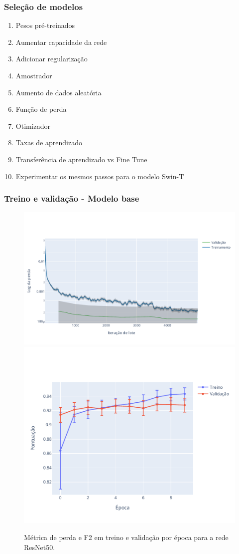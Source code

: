 \documentclass{beamer}
\begin{document}
\begin{frame}
\frametitle{Seleção de modelos}
\begin{enumerate}
    \item Pesos pré-treinados
    \item Aumentar capacidade da rede
    \item Adicionar regularização 
    \item Amostrador
    \item Aumento de dados aleatória
    \item Função de perda
    \item Otimizador
    \item Taxas de aprendizado
    \item Transferência de aprendizado vs Fine Tune
    \item Experimentar os mesmos passos para o modelo Swin-T
\end{enumerate}
\end{frame}



\begin{frame}
\frametitle{Treino e validação - Modelo base}


\begin{figure}[!ht]
    \centering
    \includegraphics[width=0.55\columnwidth]{Imagens/results/rsp-resnet-50_planet_pt/Training Loss Per Minibatch.pdf}
    \label{fig:TreinoResnetPerda}
    \centering
    \includegraphics[width=0.40\columnwidth]{Imagens/results/rsp-resnet-50_planet_pt/Pontuação em treino e validação por época.pdf}
    \caption{ Métrica de perda e F2 em treino e validação por época para a rede ResNet50.}
    \label{fig:TreinoResnetScore}
\end{figure}  

\end{frame}
\end{document}
